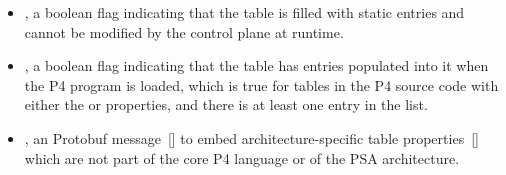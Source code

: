 \documentclass[11pt]{article}
\begin{document}
{\begin{itemize}
\begin{itemize}[noitemsep,topsep=\mdcompacttopsep]%

\item{} (default value), which means that idle timeout is not
supported for this table.%

\item{}, which means that the control plane should be notified of
the expiration of a table entry by means of a notification (see section on
).%
\end{itemize}%

\item{}
, a boolean flag indicating that the table is filled with
static entries and cannot be modified by the control plane at runtime.%

\item{}
, a boolean flag indicating that the table has
entries populated into it when the P4 program is loaded, which is
true for tables in the P4 source code with either the  or
 properties, and there is at least one entry in the
list.%

\item{}
, an  Protobuf message~[] to embed
architecture-specific table properties~[] which are not part
of the core P4 language or of the PSA architecture.%
\end{itemize}%

}
\end{document}
